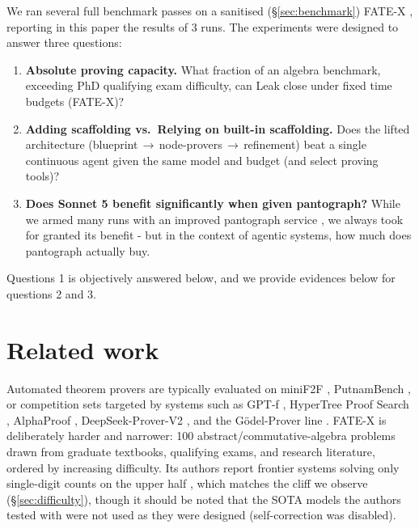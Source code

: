 \documentclass[12pt, a4paper]{article}
\begin{document}
We ran several full benchmark passes on a sanitised (\S\ref{sec:benchmark}) FATE-X
\cite{fatex2025,benchmarklist_fatex}, reporting in this paper the results of 3 runs. The experiments were designed to answer three questions:

\begin{enumerate}[itemsep=1pt]
  \item \textbf{Absolute proving capacity.} What fraction of an algebra
        benchmark, exceeding PhD qualifying exam difficulty,
        can Leak close under fixed time budgets (FATE-X)?
  \item \textbf{Adding scaffolding vs.\ Relying on built-in scaffolding.} Does the lifted architecture
        (blueprint\,$\to$\,node-provers\,$\to$\,refinement) beat a
        single continuous agent given the same model and budget (and select proving tools)?
  \item \textbf{Does Sonnet 5 benefit significantly when given pantograph?} While we armed many runs
        with an improved pantograph service \cite{leakii2026upgrade},
        we always took for granted its benefit - but in the context of agentic systems, how much
        does pantograph actually buy.
\end{enumerate}

Questions 1 is objectively answered below, and we provide evidences below for questions 2 and 3.

\section{Related work}

Automated theorem provers are typically evaluated on miniF2F
\cite{zheng2022minif2f}, PutnamBench \cite{tsoukalas2024putnambench}, or
competition sets targeted by systems such as GPT-f \cite{polu2020gptf},
HyperTree Proof Search \cite{lample2022hypertree}, AlphaProof
\cite{alphaproof2024}, DeepSeek-Prover-V2 \cite{deepseekproverv2}, and the
G\"odel-Prover line \cite{davis2025goedelspoetry}. FATE-X \cite{fatex2025}
is deliberately harder and narrower: 100 abstract/commutative-algebra problems
drawn from graduate textbooks, qualifying exams, and research literature,
ordered by increasing difficulty. Its authors report frontier systems solving
only single-digit counts on the upper half \cite{benchmarklist_fatex}, which
matches the cliff we observe (\S\ref{sec:difficulty}), though it should be
noted that the SOTA models the authors tested with were not used as they were designed
(self-correction was disabled). \\
\end{document}
